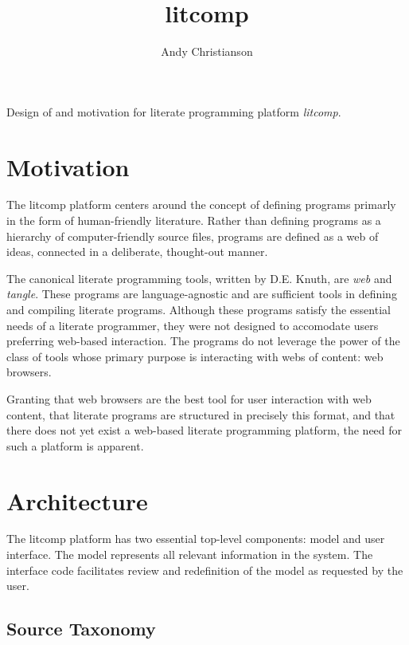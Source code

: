 \documentclass{article}
\begin{document}
\title{litcomp}
\author{Andy Christianson}
\renewcommand{\today}{March 13, 2011}
\maketitle

Design of and motivation for literate programming platform {\em litcomp}.

\pagebreak

\setcounter{tocdepth}{1}
\tableofcontents

\pagebreak

\section {Motivation}

The litcomp platform centers around the concept of defining programs primarly
in the form of human-friendly literature. Rather than defining programs
as a hierarchy of computer-friendly source files, programs are defined
as a web of ideas, connected in a deliberate, thought-out manner.

The canonical literate programming tools, written by D.E. Knuth, are
{\em web} and {\em tangle}. These programs are language-agnostic and are
sufficient tools in defining and compiling literate programs. Although
these programs satisfy the essential needs of a literate programmer,
they were not designed to accomodate users preferring web-based
interaction. The programs do not leverage the power of the class of tools
whose primary purpose is interacting with webs of content: web browsers.

Granting that web browsers are the best tool for user interaction with
web content, that literate programs are structured in precisely this
format, and that there does not yet exist a web-based literate programming
platform, the need for such a platform is apparent.

\pagebreak

\section {Architecture}

The litcomp platform has two essential top-level components: model and
user interface. The model represents all relevant information in the
system. The interface code facilitates review and redefinition of the
model as requested by the user.

\subsection {Source Taxonomy}
\end{document}
